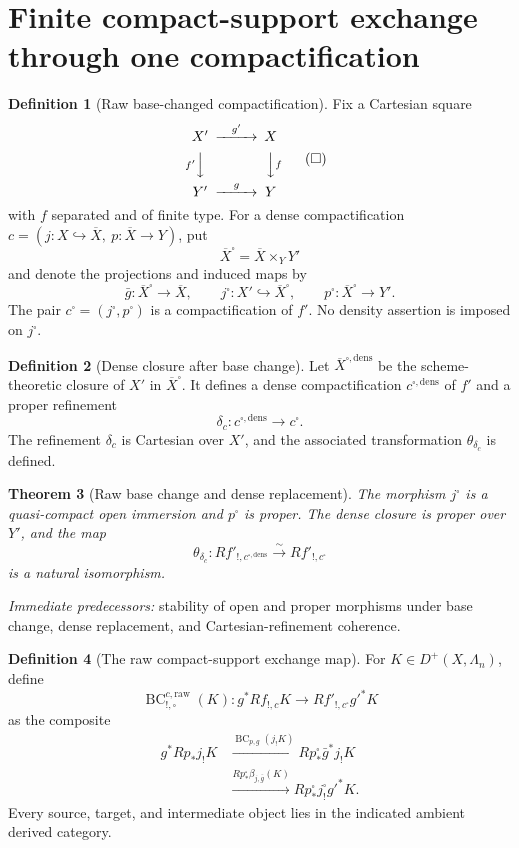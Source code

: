 \documentclass[10pt]{article}
\newtheorem{theorem}{Theorem}[section]
\theoremstyle{definition}
\newtheorem{definition}[theorem]{Definition}
\newcommand{\pred}[1]{\par\smallskip\begingroup\footnotesize\raggedright
\emph{Immediate predecessors:} #1.\par\endgroup}
\begin{document}
\section{Finite compact-support exchange through one compactification}

\begin{definition}[Raw base-changed compactification]
Fix a Cartesian square
\[
\begin{CD}
 X'@>{g'}>>X\\
 @V{f'}VV @VV{f}V\\
 Y'@>{g}>>Y
\end{CD}
\tag{\(\square\)}
\]
with \(f\) separated and of finite type.  For a dense compactification
\(c=(j:X\hookrightarrow\overline X,\ p:\overline X\to Y)\), put
\[
 \overline X^\square=\overline X\times_YY'
\]
and denote the projections and induced maps by
\[
 \bar g:\overline X^\square\to\overline X,\qquad
 j^\square:X'\hookrightarrow\overline X^\square,\qquad
 p^\square:\overline X^\square\to Y'.
\]
The pair \(c^\square=(j^\square,p^\square)\) is a compactification of
\(f'\).  No density assertion is imposed on \(j^\square\).
\end{definition}

\begin{definition}[Dense closure after base change]
Let \(\overline X^{\square,\mathrm{dens}}\) be the scheme-theoretic closure
of \(X'\) in \(\overline X^\square\).  It defines a dense compactification
\(c^{\square,\mathrm{dens}}\) of \(f'\) and a proper refinement
\[
 \delta_c:c^{\square,\mathrm{dens}}\longrightarrow c^\square.
\]
The refinement \(\delta_c\) is Cartesian over \(X'\), and the associated
transformation \(\theta_{\delta_c}\) is defined.
\end{definition}

\begin{theorem}[Raw base change and dense replacement]
The morphism \(j^\square\) is a quasi-compact open immersion and
\(p^\square\) is proper.  The dense closure is proper over \(Y'\), and the
map
\[
 \theta_{\delta_c}:
 Rf'_{!,c^{\square,\mathrm{dens}}}
 \xrightarrow{\sim}Rf'_{!,c^\square}
\]
is a natural isomorphism.
\end{theorem}
\pred{stability of open and proper morphisms under base change, dense replacement, and Cartesian-refinement coherence}

\begin{definition}[The raw compact-support exchange map]
For \(K\in D^+(X,\Lambda_n)\), define
\[
 \operatorname{BC}^{c,\mathrm{raw}}_{!,\square}(K):
 g^*Rf_{!,c}K\longrightarrow Rf'_{!,c^\square}g'^*K
\]
as the composite
\[
\begin{aligned}
 g^*Rp_*j_!K
 &\xrightarrow{\operatorname{BC}_{p,g}(j_!K)}
 Rp^\square_*\bar g^*j_!K\\
 &\xrightarrow{Rp^\square_*\beta_{j,\bar g}(K)}
 Rp^\square_*j^\square_!g'^*K.
\end{aligned}
\]
Every source, target, and intermediate object lies in the indicated ambient
derived category.
\end{definition}
\end{document}
